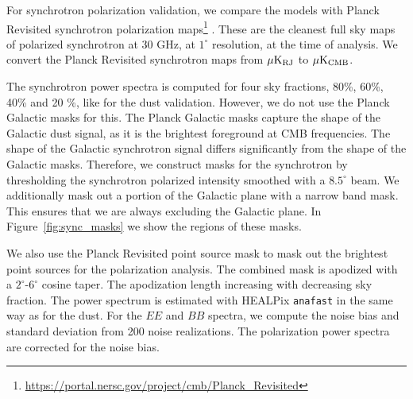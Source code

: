 \documentclass[twocolumn]{aastex631}
\newcommand{\giuse}[1]{\textcolor{orange}{(GP: #1)}}
\begin{document}

For synchrotron polarization validation, we compare the models with Planck Revisited synchrotron polarization maps\footnote{\url{https://portal.nersc.gov/project/cmb/Planck\_Revisited}} \citep{Delabrouille:2024}. These are the cleanest full sky maps of polarized synchrotron at 30 GHz, at $1^\circ$ resolution, at the time of analysis. We convert the Planck Revisited synchrotron maps from $\mu {\rm K_{RJ}}$ to $\mu {\rm K_{CMB}}$. 

The synchrotron power spectra is computed for four sky fractions, 80\%, 60\%, 40\% and 20 \%, like for the dust validation. However, we do not use the Planck Galactic masks for this. The Planck Galactic masks capture the shape of the Galactic dust signal, as it is the brightest foreground at CMB frequencies. The shape of the Galactic synchrotron signal differs significantly from the shape of the Galactic masks. Therefore, we construct masks for the synchrotron by thresholding the synchrotron polarized intensity smoothed with a $8.5^\circ$ beam. We additionally mask out a portion of the Galactic plane with a narrow band mask. This ensures that we are always excluding the Galactic plane. In Figure~\ref{fig:sync_masks} we show the regions of these masks. 

We also use the Planck Revisited point source mask to mask out the brightest point sources for the polarization analysis. The combined mask is apodized with a $2^\circ$-$6^\circ$ cosine taper. The apodization length increasing with decreasing sky fraction. The power spectrum is estimated with HEALPix \texttt{anafast} in the same way as for the dust. For the $EE$ and $BB$ spectra, we compute the noise bias and standard deviation from 200 noise realizations. The polarization power spectra are corrected for the noise bias. 
\end{document}
